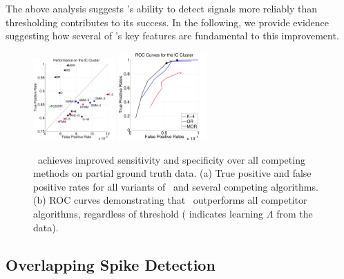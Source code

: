 The above analysis suggests \smug's ability to detect signals more reliably than thresholding contributes to its success.  In the following, we provide evidence suggesting how several of \smug's key features are fundamental to this improvement.
%
\begin{center}
\begin{figure}
	\includegraphics[width=0.28\textwidth]{../figs/truefalsepositive.pdf}
	\includegraphics[width=0.3\textwidth]{../figs/new/icroc.pdf}
\caption{\smug\ achieves improved sensitivity and specificity over all competing methods on partial ground truth data. %
(a) True positive and false positive rates for all variants of \smug\ and several competing 
algorithms.  
(b) ROC curves demonstrating that \smug\ outperforms all competitor algorithms, regardless of threshold (\jovo{$\bullet$} indicates learning $\Lambda$ from the data).\label{hc1res}}
\end{figure}
\end{center}
% 
% 
% 
\vspace{-10pt}
\subsection{Overlapping Spike Detection}



